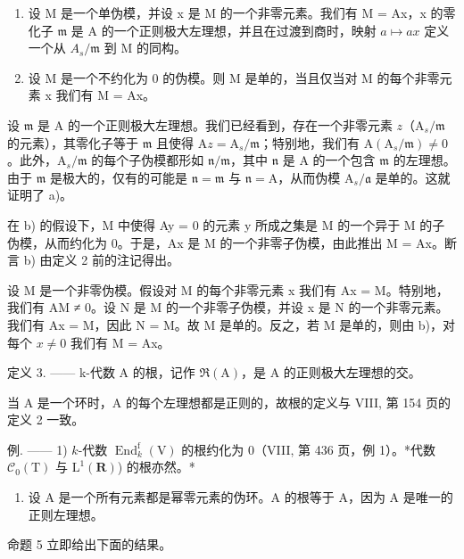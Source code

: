 \begin{enumerate}
\def\labelenumi{\alph{enumi})}
\setcounter{enumi}{1}
\item
  设 M 是一个单伪模，并设 x 是 M 的一个非零元素。我们有 M = Ax，x 的零化子 \(\mathfrak{m}\) 是 A 的一个正则极大左理想，并且在过渡到商时，映射 \(a \mapsto ax\) 定义一个从 \(A_{s}/\mathfrak{m}\) 到 M 的同构。
\item
  设 M 是一个不约化为 0 的伪模。则 M 是单的，当且仅当对 M 的每个非零元素 x 我们有 M = Ax。
\end{enumerate}

设 \(\mathfrak{m}\) 是 A 的一个正则极大左理想。我们已经看到，存在一个非零元素 \(z\)（\(\mathrm{A}_s / \mathfrak{m}\) 的元素），其零化子等于 \(\mathfrak{m}\) 且使得 \(\mathrm{A}z = \mathrm{A}_s / \mathfrak{m}\)；特别地，我们有 \(\mathrm{A}(\mathrm{A}_s / \mathfrak{m}) \neq 0\)。此外，\(\mathrm{A}_s / \mathfrak{m}\) 的每个子伪模都形如 \(\mathfrak{n} / \mathfrak{m}\)，其中 \(\mathfrak{n}\) 是 A 的一个包含 \(\mathfrak{m}\) 的左理想。由于 \(\mathfrak{m}\) 是极大的，仅有的可能是 \(\mathfrak{n} = \mathfrak{m}\) 与 \(\mathfrak{n} = \mathrm{A}\)，从而伪模 \(\mathrm{A}_s / \mathfrak{a}\) 是单的。这就证明了 a)。

在 b) 的假设下，M 中使得 Ay = 0 的元素 y 所成之集是 M 的一个异于 M 的子伪模，从而约化为 0。于是，Ax 是 M 的一个非零子伪模，由此推出 M = Ax。断言 b) 由定义 2 前的注记得出。

设 M 是一个非零伪模。假设对 M 的每个非零元素 x 我们有 Ax = M。特别地，我们有 AM ≠ 0。设 N 是 M 的一个非零子伪模，并设 x 是 N 的一个非零元素。我们有 Ax = M，因此 N = M。故 M 是单的。反之，若 M 是单的，则由 b)，对每个 \(x \neq 0\) 我们有 M = Ax。

定义 3. —— k-代数 A 的根，记作 \(\Re(\mathrm{A})\)，是 A 的正则极大左理想的交。

当 A 是一个环时，A 的每个左理想都是正则的，故根的定义与 VIII, 第 154 页的定义 2 一致。

例. —— 1) \(k\)-代数 \(\operatorname{End}_k^{\mathrm{f}}(\mathrm{V})\) 的根约化为 0（VIII, 第 436 页，例 1）。*代数 \(\mathcal{C}_0(\mathrm{T})\) 与 \(\mathrm{L}^1 (\mathbf{R})\)) 的根亦然。*

\begin{enumerate}
\def\labelenumi{\arabic{enumi})}
\setcounter{enumi}{1}
\tightlist
\item
  设 A 是一个所有元素都是幂零元素的伪环。A 的根等于 A，因为 A 是唯一的正则左理想。
\end{enumerate}

命题 5 立即给出下面的结果。

